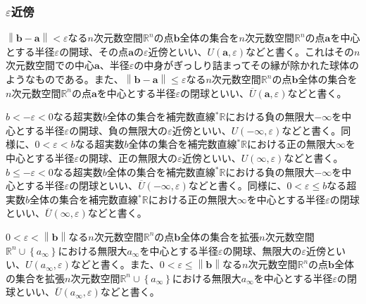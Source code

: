 \documentclass[dvipdfmx]{jsarticle}
\begin{document}
\subsubsection{$\varepsilon$近傍}%
\begin{dfn}
$\left\| \mathbf{b} - \mathbf{a} \right\| < \varepsilon$なる$n$次元数空間$\mathbb{R}^{n}$の点$\mathbf{b}$全体の集合を$n$次元数空間$\mathbb{R}^{n}$の点$\mathbf{a}$を中心とする半径$\varepsilon$の開球、その点$\mathbf{a}$の$\varepsilon$近傍といい、$U\left( \mathbf{a},\varepsilon \right)$などと書く。これはその$n$次元数空間での中心$\mathbf{a}$、半径$\varepsilon$の中身がぎっしり詰まってその縁が除かれた球体のようなものである。また、$\left\| \mathbf{b} - \mathbf{a} \right\| \leq \varepsilon$なる$n$次元数空間$\mathbb{R}^{n}$の点$\mathbf{b}$全体の集合を$n$次元数空間$\mathbb{R}^{n}$の点$\mathbf{a}$を中心とする半径$\varepsilon$の閉球といい、$\overline{U}\left( \mathbf{a},\varepsilon \right)$などと書く。
\end{dfn}
\begin{dfn}
$b < - \varepsilon < 0$なる超実数$b$全体の集合を補完数直線${}^{*}\mathbb{R}$における負の無限大$- \infty$を中心とする半径$\varepsilon$の開球、負の無限大の$\varepsilon$近傍といい、$U( - \infty,\varepsilon)$などと書く。同様に、$0 < \varepsilon < b$なる超実数$b$全体の集合を補完数直線${}^{*}\mathbb{R}$における正の無限大$\infty$を中心とする半径$\varepsilon$の開球、正の無限大の$\varepsilon$近傍といい、$U(\infty,\varepsilon)$などと書く。$b \leq - \varepsilon < 0$なる超実数$b$全体の集合を補完数直線${}^{*}\mathbb{R}$における負の無限大$- \infty$を中心とする半径$\varepsilon$の閉球といい、$\overline{U}( - \infty,\varepsilon)$などと書く。同様に、$0 < \varepsilon \leq b$なる超実数$b$全体の集合を補完数直線${}^{*}\mathbb{R}$における正の無限大$\infty$を中心とする半径$\varepsilon$の閉球といい、$\overline{U}(\infty,\varepsilon)$などと書く。
\end{dfn}
\begin{dfn}
$0 < \varepsilon < \left\| \mathbf{b} \right\|$なる$n$次元数空間$\mathbb{R}^{n}$の点$\mathbf{b}$全体の集合を拡張$n$次元数空間$\mathbb{R}^{n} \cup \left\{ a_{\infty} \right\}$における無限大$a_{\infty}$を中心とする半径$\varepsilon$の開球、無限大の$\varepsilon$近傍といい、$U\left( a_{\infty},\varepsilon \right)$などと書く。また、$0 < \varepsilon \leq \left\| \mathbf{b} \right\|$なる$n$次元数空間$\mathbb{R}^{n}$の点$\mathbf{b}$全体の集合を拡張$n$次元数空間$\mathbb{R}^{n} \cup \left\{ a_{\infty} \right\}$における無限大$a_{\infty}$を中心とする半径$\varepsilon$の閉球といい、$\overline{U}\left( a_{\infty},\varepsilon \right)$などと書く。
\end{dfn}
\end{document}
